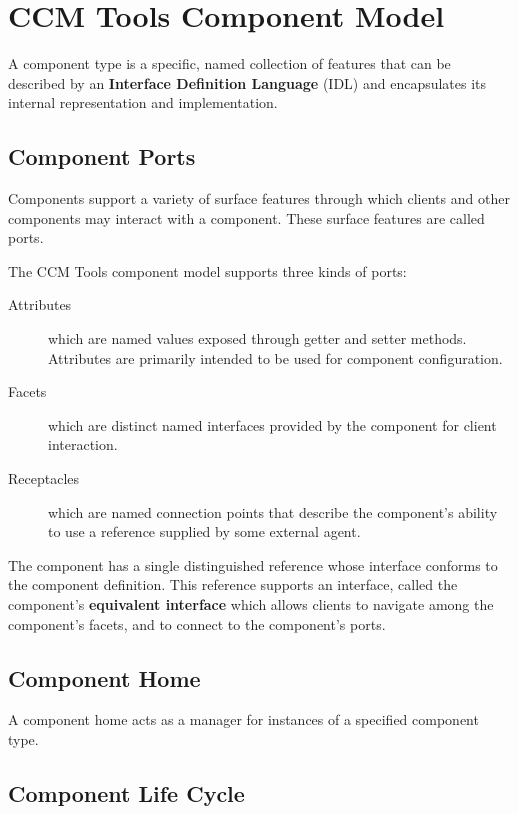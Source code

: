 \section{CCM Tools Component Model}
\label{section:CcmtoolsComponentModel}

A component type is a specific, named collection of features that can be
described by an {\bf Interface Definition Language} (IDL) and encapsulates its
internal representation and implementation.


\subsection{Component Ports}

Components support a variety of surface features through which clients and other
components may interact with a component. These surface features are called
ports.

The CCM Tools component model supports three kinds of ports:
\begin{description}
\item [Attributes] which are named values exposed through getter and setter
methods. Attributes are primarily intended to be used for component configuration.

\item [Facets] which are distinct named interfaces provided by the component
for client interaction.


\item [Receptacles] which are named connection points that describe the
component's ability to use a reference supplied by some external agent.
\end{description}

The component has a single distinguished reference whose interface conforms to
the component definition.
This reference supports an interface, called the component's 
{\bf equivalent interface} which allows clients to navigate among the
component's facets, and to connect to the component's ports.



\subsection{Component Home}

A component home acts as a manager for instances of a specified component type.



\subsection{Component Life Cycle}

\newpage
